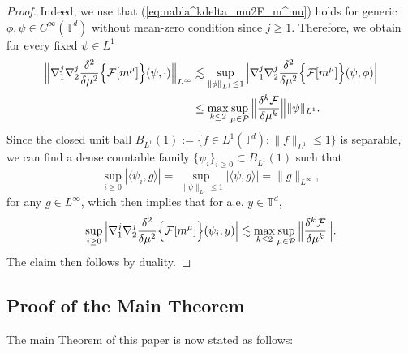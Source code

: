 \begin{proof}
Indeed, we use that (\ref{eq:nabla^kdelta_mu2F_m^mu}) holds for generic $\phi, \psi \in C^{\infty}(\mathbb{T}^d)$ without mean-zero condition since $j \geq 1$. Therefore, we obtain for every fixed $\psi \in L^1$
\begin{align*}
   \Big\|\nabla_1^j \nabla_2^j \frac{\delta^2}{\delta \mu^2}\Big\{\mathcal{F}[m^{\mu}]\Big\}(\psi, \cdot)\Big\|_{L^\infty} &\lesssim \sup_{\|\phi\|_{L^1} \le 1} \Big|\nabla_1^j \nabla_2^j \frac{\delta^2}{\delta \mu^2}\Big\{\mathcal{F}[m^{\mu}]\Big\}(\psi, \phi)\Big| \\
   & \leq \max_{k \leq 2} \sup_{\mu \in \mathcal{P}}\Big\|\frac{\delta^k \mathcal{F}}{\delta \mu^k}\Big\| \|\psi\|_{L^1}.
\end{align*}
Since the closed unit ball
$B_{L^1}(1) := \{f \in L^1(\mathbb{T}^d): \|f\|_{L^1} \leq 1\}$ is separable, we can find a dense countable family $\{\psi_i\}_{i \geq 0} \subset B_{L^1}(1)$ such that 
\[
\sup_{i \geq 0}|\langle\psi_i,g\rangle| = \sup_{\|\psi\|_{L^1}\leq 1}|\langle\psi,g\rangle| = \|g\|_{L^{\infty}},
\]
for any $g \in L^{\infty}$, which then implies that for a.e. $y \in \mathbb{T}^d$, 
\[
 \sup_{i \geq 0} \Big|\nabla_1^j \nabla_2^j \frac{\delta^2}{\delta \mu^2}\Big\{\mathcal{F}[m^{\mu}]\Big\}(\psi_i, y)\Big| \lesssim\max_{k \leq 2} \sup_{\mu \in \mathcal{P}}\Big\|\frac{\delta^k \mathcal{F}}{\delta \mu^k}\Big\|.
\]
The claim then follows by duality.
\end{proof}

\subsection{Proof of the Main Theorem}
The main Theorem of this paper is now stated as follows:

